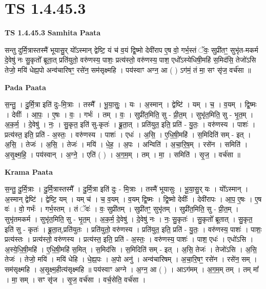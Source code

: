 \documentclass[17pt]{extarticle}
\begin{document}
\section*{ TS 1.4.45.3 }

\textbf{TS 1.4.45.3 } \newline
\textbf{Samhita Paata} \newline

सन्तु दुर्मि॒त्रास्तस्मै॑ भूयासु॒र् यो᳚ऽस्मान् द्वेष्टि॒ यं च॑ व॒यं द्वि॒ष्मो देवी॑राप ए॒ष वो॒ गर्भ॒स्तं ॅवः॒ सुप्री॑तꣳ॒॒ सुभृ॑त-मकर्म दे॒वेषु॑ नः सु॒कृतो᳚ ब्रूता॒त् प्रति॑युतो॒ वरु॑णस्य॒ पाशः॒ प्रत्य॑स्तो॒ वरु॑णस्य॒ पाश॒ एधो᳚ऽस्येधिषी॒महि॑ स॒मिद॑सि॒ तेजो॑ऽसि तेजो॒ मयि॑ धेह्य॒पो अन्व॑चारिषꣳ॒॒ रसे॑न॒ सम॑सृक्ष्महि । पय॑स्वाꣳ अग्न॒ आ ( ) ऽग॑मं॒ तं मा॒ सꣳ सृ॑ज॒ वर्च॑सा ॥ \newline

\textbf{Pada Paata} \newline

स॒न्तु॒ । दु॒र्मि॒त्रा इति॑ दुः-मि॒त्राः । तस्मै᳚ । भू॒या॒सुः॒ । यः । अ॒स्मान् । द्वेष्टि॑ । यम् । च॒ । व॒यम् । द्वि॒ष्मः । देवीः᳚ । आ॒पः॒ । ए॒षः । वः॒ । गर्भः॑ । तम् । वः॒ । सुप्री॑त॒मिति॒ सु - प्री॒त॒म् । सुभृ॑त॒मिति॒ सु - भृ॒त॒म् । अ॒क॒र्म॒ । दे॒वेषु॑ । नः॒ । सु॒कृत॒ इति॑ सु-कृतः॑ । ब्रू॒ता॒त् । प्रति॑युत॒ इति॒ प्रति॑ - यु॒तः॒ । वरु॑णस्य । पाशः॑ । प्रत्य॑स्त॒ इति॒ प्रति॑ - अ॒स्तः॒ । वरु॑णस्य । पाशः॑ । एधः॑ । अ॒सि॒ । ए॒धि॒षी॒महि॑ । स॒मिदिति॑ सम् - इत् । अ॒सि॒ । तेजः॑ । अ॒सि॒ । तेजः॑ । मयि॑ । धे॒ह॒ । अ॒पः । अन्विति॑ । अ॒चा॒रि॒ष॒म् । रसे॑न । समिति॑ । अ॒सृ॒क्ष्म॒हि॒ । पय॑स्वान् । अ॒ग्ने॒ । एति॑ ( ) । अ॒ग॒म॒म् । तम् । मा॒ । समिति॑ । सृ॒ज॒ । वर्च॑सा ॥  \newline


\textbf{Krama Paata} \newline

स॒न्तु॒ दु॒र्मि॒त्राः । दु॒र्मि॒त्रास्तस्मै᳚ । दु॒र्मि॒त्रा इति॑ दुः - मि॒त्राः । तस्मै॑ भूयासुः । भू॒या॒सु॒र् यः । 
यो᳚ऽस्मान् । अ॒स्मान् द्वेष्टि॑ । द्वेष्टि॒ यम् । यम् च॑ । च॒ व॒यम् । व॒यम् द्वि॒ष्मः । द्वि॒ष्मो देवीः᳚ । देवी॑रापः । आ॒प॒ ए॒षः । ए॒ष वः॑ । वो॒ गर्भः॑ । गर्भ॒स्तम् । तं ॅवः॑ । वः॒ सुप्री॑तम् । सुप्री॑तꣳ॒॒ सुभृ॑तम् । सुप्री॑त॒मिति॒ सु - प्री॒त॒म् । सुभृ॑तमकर्म । सुभृ॑त॒मिति॒ सु - भृ॒त॒म् । अ॒क॒र्म॒ दे॒वेषु॑ । दे॒वेषु॑ नः । नः॒ सु॒कृतः॑ । सु॒कृतो᳚ ब्रूतात् । सु॒कृत॒ इति॑ सु - कृतः॑ । ब्रू॒ता॒त्,प्रति॑युतः । प्रति॑युतो॒ वरु॑णस्य । प्रति॑युत॒ इति॒ प्रति॑ - यु॒तः॒ । वरु॑णस्य॒ पाशः॑ । पाशः॒ प्रत्य॑स्तः । प्रत्य॑स्तो॒ वरु॑णस्य । प्रत्य॑स्त॒ इति॒ प्रति॑ - अ॒स्तः॒ । वरु॑णस्य॒ पाशः॑ । पाश॒ एधः॑ । एधो॑ऽसि । अ॒स्ये॒धि॒षी॒महि॑ । ए॒धि॒षी॒महि॑ स॒मित् । स॒मिद॑सि । स॒मिदिति॑ सम् - इत् । अ॒सि॒ तेजः॑ । तेजो॑ऽसि । अ॒सि॒ तेजः॑ । तेजो॒ मयि॑ । मयि॑ धेहि । धे॒ह्य॒पः । अ॒पो अनु॑ । अन्व॑चारिषम् । अ॒चा॒रि॒षꣳ॒॒ रसे॑न । रसे॑न॒ सम् । सम॑सृक्ष्महि । अ॒सृ॒क्ष्म॒हीत्य॑सृक्ष्महि ॥ पय॑स्वाꣳ अग्ने । अ॒ग्न॒ आ ( ) । आऽग॑मम् । अ॒ग॒म॒म् तम् । तम् मा᳚ । मा॒ सम् । सꣳ सृ॑ज । सृ॒ज॒ वर्च॑सा । वर्च॒सेति॒ वर्च॑सा । \newline
\end{document}
